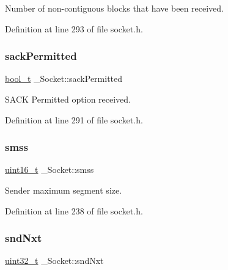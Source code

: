 Number of non-\/contiguous blocks that have been received. 



Definition at line 293 of file socket.\+h.

\mbox{\label{struct__Socket_a8ddd2cd0a0b59880a111d99659ef5dbf}} 
\subsubsection{\texorpdfstring{sack\+Permitted}{sackPermitted}}
{\footnotesize\ttfamily \hyperlink{compiler__port_8h_a812d16e5494522586b3784e55d479912}{bool\+\_\+t} \+\_\+\+Socket\+::sack\+Permitted}



S\+A\+CK Permitted option received. 



Definition at line 291 of file socket.\+h.

\mbox{\label{struct__Socket_aea7a5830dae93a270575c42bf1ac7abd}} 
\subsubsection{\texorpdfstring{smss}{smss}}
{\footnotesize\ttfamily \hyperlink{stdint_8h_a273cf69d639a59973b6019625df33e30}{uint16\+\_\+t} \+\_\+\+Socket\+::smss}



Sender maximum segment size. 



Definition at line 238 of file socket.\+h.

\mbox{\label{struct__Socket_a208ad366ba441629645457c741a5352d}} 
\subsubsection{\texorpdfstring{snd\+Nxt}{sndNxt}}
{\footnotesize\ttfamily \hyperlink{stdint_8h_a435d1572bf3f880d55459d9805097f62}{uint32\+\_\+t} \+\_\+\+Socket\+::snd\+Nxt}



